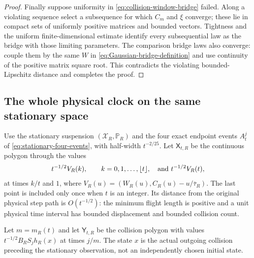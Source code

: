 \begin{proof}
Finally suppose uniformity in \eqref{eq:collision-window-bridge}
failed. Along a violating sequence select a subsequence for which
$C_m$ and $\xi$ converge; these lie in compact sets of uniformly
positive matrices and bounded vectors. Tightness and the uniform
finite-dimensional estimate identify every subsequential law as the
bridge with those limiting parameters. The comparison bridge laws
also converge: couple them by the same $W$ in
\eqref{eq:Gaussian-bridge-definition} and use continuity of the
positive matrix square root. This contradicts the violating
bounded-Lipschitz distance and completes the proof.
\end{proof}

\subsection{The whole physical clock on the same stationary space}
Use the stationary suspension $(\mathcal X_R,\mathbb P_R)$ and the
four exact endpoint events $A_t^j$ of
\eqref{eq:stationary-four-events}, with half-width $t^{-2/25}$.
Let $\mathsf X_{t,R}$ be the continuous polygon through the values
\[
 t^{-1/2}V_R(k),\qquad k=0,1,\ldots,\lfloor t\rfloor,
 \quad\hbox{and }t^{-1/2}V_R(t),
\]
at times $k/t$ and $1$, where
$V_R(u)=(W_R(u),C_R(u)-u/\bar\tau_R)$.
The last point is included only once when $t$ is an integer.
Its distance from the original physical step path is $O(t^{-1/2})$:
the minimum flight length is positive and a unit physical time interval
has bounded displacement and bounded collision count.

Let $m=m_R(t)$ and let $\mathsf Y_{t,R}$ be the collision polygon
with values $t^{-1/2}B_RS_jh_R(x)$ at times $j/m$.
The state $x$ is the actual outgoing collision preceding the stationary
observation, not an independently chosen initial state.

